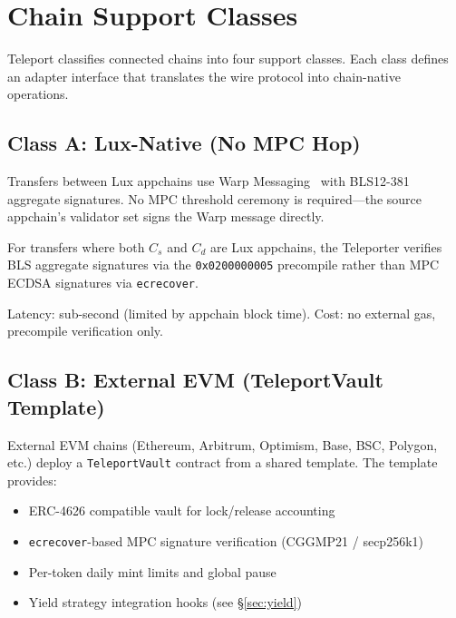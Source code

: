 \section{Chain Support Classes}

\label{sec:adapters}

Teleport classifies connected chains into four support classes. Each class defines an adapter interface that translates the wire protocol into chain-native operations.

\subsection{Class A: Lux-Native (No MPC Hop)}
\label{sec:class-a}

Transfers between Lux appchains use Warp Messaging~\cite{luxwarp2023} with BLS12-381 aggregate signatures. No MPC threshold ceremony is required---the source appchain's validator set signs the Warp message directly.

\begin{property}
For transfers where both $C_s$ and $C_d$ are Lux appchains, the Teleporter verifies BLS aggregate signatures via the \texttt{0x0200000005} precompile rather than MPC ECDSA signatures via \texttt{ecrecover}.
\end{property}

Latency: sub-second (limited by appchain block time). Cost: no external gas, precompile verification only.

\subsection{Class B: External EVM (TeleportVault Template)}
\label{sec:class-b}

External EVM chains (Ethereum, Arbitrum, Optimism, Base, BSC, Polygon, etc.) deploy a \texttt{TeleportVault} contract from a shared template. The template provides:

\begin{itemize}[nosep]
  \item ERC-4626 compatible vault for lock/release accounting
  \item \texttt{ecrecover}-based MPC signature verification (CGGMP21 / secp256k1)
  \item Per-token daily mint limits and global pause
  \item Yield strategy integration hooks (see \S\ref{sec:yield})
\end{itemize}


